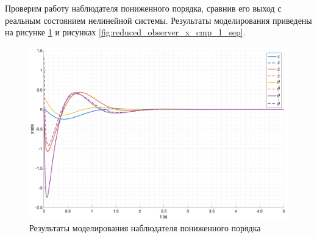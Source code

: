 Проверим работу наблюдателя пониженного порядка, сравнив его выход с реальным состоянием нелинейной системы.
Результаты моделирования приведены на рисунке \ref{fig:reduced_observer_x_1} и рисунках \ref{fig:reduced_observer_x_cmp_1_sep}.
\begin{figure}[ht!]
    \centering
    \includegraphics[width=\textwidth]{media/plots/reduced_observer/reduced_observer_cmp_1.png}
    \caption{Результаты моделирования наблюдателя пониженного порядка}
    \label{fig:reduced_observer_x_1}
\end{figure}

